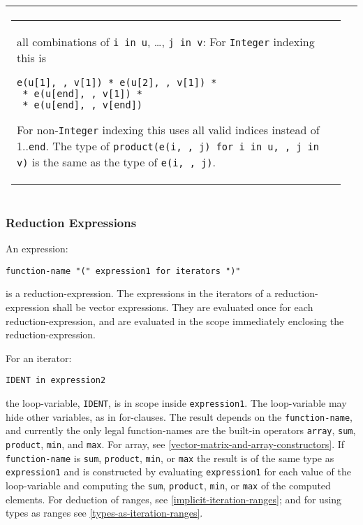 \begin{longtable}{|p{4.1cm}|p{10.1cm}|}
\begin{tabular}{@{}p{10cm}@{}}
all combinations of \lstinline!i in u!, \ldots, \lstinline!j in v!: For \lstinline!Integer! indexing this is
\begin{lstlisting}[language=modelica,mathescape=true]
e(u[1], $\ldots$, v[1]) * e(u[2], $\ldots$, v[1]) * $\ldots$
 * e(u[end], $\ldots$, v[1]) * $\ldots$
 * e(u[end], $\ldots$, v[end])
\end{lstlisting}
For non-\lstinline!Integer! indexing this uses all valid indices instead of 1..\lstinline!end!.
The type of \lstinline[mathescape=true]!product(e(i, $\ldots$, j) for i in u, $\ldots$, j in v)! is the same as the type of \lstinline[mathescape=true]!e(i, $\ldots$, j)!.
\end{tabular}
\\ \hline
\end{longtable}

\subsubsection{Reduction Expressions}

An expression:
\begin{lstlisting}[language=grammar]
function-name "(" expression1 for iterators ")"
\end{lstlisting}

is a reduction-expression. The expressions in the iterators of a
reduction-expression shall be vector expressions. They are evaluated
once for each reduction-expression, and are evaluated in the scope
immediately enclosing the reduction-expression.

For an iterator:
\begin{lstlisting}[language=grammar]
IDENT in expression2
\end{lstlisting}

the loop-variable, \lstinline!IDENT!, is in scope inside \lstinline!expression1!. The
loop-variable may hide other variables, as in for-clauses. The result
depends on the \lstinline!function-name!, and currently the only legal
function-names are the built-in operators \lstinline!array!, \lstinline!sum!,
\lstinline!product!, \lstinline!min!, and
\lstinline!max!. For array, see \autoref{vector-matrix-and-array-constructors}. If \lstinline!function-name! is
\lstinline!sum!, \lstinline!product!, \lstinline!min!,
or \lstinline!max! the result is of the same type as \lstinline!expression1! and is constructed
by evaluating \lstinline!expression1! for each value of the loop-variable and
computing the \lstinline!sum!, \lstinline!product!, \lstinline!min!, or
\lstinline!max! of the computed elements. For
deduction of ranges, see \autoref{implicit-iteration-ranges}; and for using types as ranges
see \autoref{types-as-iteration-ranges}.

